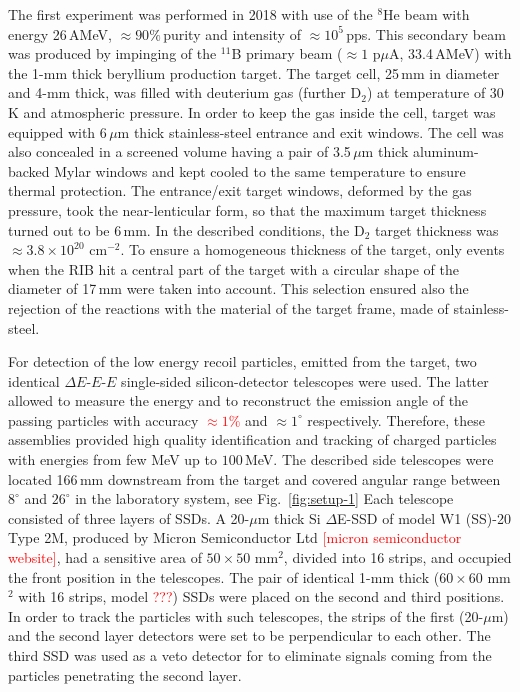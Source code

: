 The first experiment was performed in 2018 with use of the $^{8}$He beam with energy 26\,AMeV, $\approx90\%$\,purity and intensity of $\approx10^{5}$\,pps.
This secondary beam was produced by impinging of the $^{11}$B primary beam ($\approx 1$ p$\mu$A, 33.4\,AMeV) with  the 1-mm thick beryllium production target.
The target cell, 25\,mm in diameter and 4-mm thick, was filled with deuterium gas (further D$_{2}$) at temperature of 30\,K and atmospheric pressure. 
In order to keep the gas inside the cell, target was equipped with 6\,$\mu$m thick stainless-steel entrance and exit windows.
The cell was also concealed in a screened volume having a pair of 3.5\,$\mu$m thick aluminum-backed Mylar windows and kept cooled to the same temperature to ensure thermal protection.
The entrance/exit target windows, deformed by the gas pressure, took the near-lenticular form, so that the maximum target thickness turned out to be 6\,mm.
In the described conditions, the D$_{2}$ target thickness was $\approx 3.8 \times 10 ^{20}$ cm$^{-2}$.
To ensure a homogeneous thickness of the target, only events when the RIB hit a central part of the target with a circular shape of the diameter of 17\,mm were taken into account.
This selection ensured also the rejection of the reactions with the material of the target frame, made of stainless-steel.

For detection of the low energy recoil particles, emitted from the target, two identical $\Delta E$-$E$-$E$ single-sided silicon-detector telescopes were used. 
The latter allowed to measure the energy and to reconstruct the emission angle of the passing particles with accuracy \textcolor{red}{$\approx1\%$} and $\approx1^{\circ}$ respectively.
Therefore, these assemblies provided high quality identification and tracking of charged particles with energies from few MeV up to $100$\,MeV.
The described side telescopes were located 166\,mm downstream from the target and covered angular range between $8^{\circ}$ and $26^{\circ}$ in the laboratory system, see Fig.\ \ref{fig:setup-1} 
Each telescope consisted of three layers of SSDs. 
A 20-$\mu$m thick Si $\Delta$E-SSD of model W1 (SS)-20 Type 2M, produced by Micron Semiconductor Ltd \textcolor{red}{[micron semiconductor website]}, had a sensitive area of $50 \times 50$ mm$^2$, divided into 16 strips, and occupied the front position in the telescopes.
The pair of identical 1-mm thick ($60 \times 60$ mm$^2$ with 16 strips, model \textcolor{red}{???}) SSDs were placed on the second and third positions.
In order to track the particles with such telescopes, the strips of the first (20-$\mu$m) and the second layer detectors were set to be perpendicular to each other. 
The third SSD was used as a veto detector for to eliminate signals coming from the particles penetrating the second layer.

